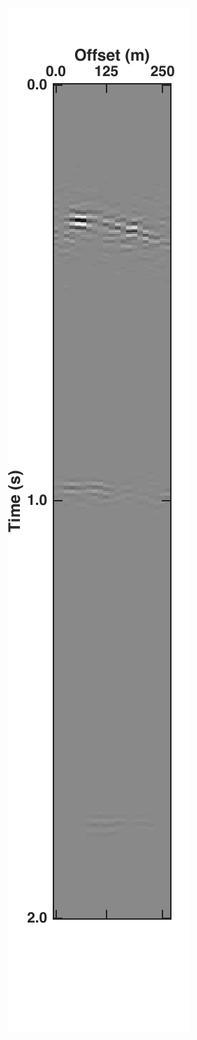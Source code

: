 \begin{figure}
\begin{subfigure}[t]{0.24\textwidth}
		\caption{}
		\label{fig:Ch-Results-Unbl-xline10}
	\end{subfigure}
	\centering
	\begin{subfigure}[t]{0.24\textwidth}
		\centering
		\includegraphics[height = 0.38\textheight]{Plots/BlendingPatterns/Deblended_xline10x}

\end{subfigure}
\end{figure}
